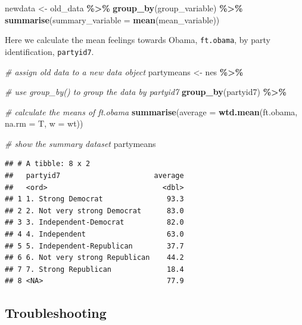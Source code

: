\documentclass[
]{book}
\newenvironment{Shaded}{\begin{snugshade}}{\end{snugshade}}
\newcommand{\AttributeTok}[1]{\textcolor[rgb]{0.13,0.29,0.53}{#1}}
\newcommand{\CommentTok}[1]{\textcolor[rgb]{0.56,0.35,0.01}{\textit{#1}}}
\newcommand{\FunctionTok}[1]{\textcolor[rgb]{0.13,0.29,0.53}{\textbf{#1}}}
\newcommand{\NormalTok}[1]{#1}
\newcommand{\OtherTok}[1]{\textcolor[rgb]{0.56,0.35,0.01}{#1}}
\newcommand{\SpecialCharTok}[1]{\textcolor[rgb]{0.81,0.36,0.00}{\textbf{#1}}}
\begin{document}
\begin{Shaded}
\begin{Highlighting}[]
\NormalTok{newdata }\OtherTok{\textless{}{-}}\NormalTok{ old\_data }\SpecialCharTok{\%\textgreater{}\%}
  \FunctionTok{group\_by}\NormalTok{(group\_variable) }\SpecialCharTok{\%\textgreater{}\%}
  \FunctionTok{summarise}\NormalTok{(}\AttributeTok{summary\_variable =} \FunctionTok{mean}\NormalTok{(mean\_variable))}
\end{Highlighting}
\end{Shaded}

Here we calculate the mean feelings towards Obama, \texttt{ft.obama}, by party identification, \texttt{partyid7}.

\begin{Shaded}
\begin{Highlighting}[]
\CommentTok{\# assign old data to a new data object}
\NormalTok{partymeans }\OtherTok{\textless{}{-}}\NormalTok{ nes }\SpecialCharTok{\%\textgreater{}\%}
  
  \CommentTok{\# use group\_by() to group the data by partyid7}
  \FunctionTok{group\_by}\NormalTok{(partyid7) }\SpecialCharTok{\%\textgreater{}\%}
  
  \CommentTok{\# calculate the means of ft.obama}
  \FunctionTok{summarise}\NormalTok{(}\AttributeTok{average =} \FunctionTok{wtd.mean}\NormalTok{(ft.obama, }\AttributeTok{na.rm =}\NormalTok{ T,}
                               \AttributeTok{w =}\NormalTok{ wt))}

\CommentTok{\# show the summary dataset}
\NormalTok{partymeans}
\end{Highlighting}
\end{Shaded}

\begin{verbatim}
## # A tibble: 8 x 2
##   partyid7                      average
##   <ord>                           <dbl>
## 1 1. Strong Democrat               93.3
## 2 2. Not very strong Democrat      83.0
## 3 3. Independent-Democrat          82.0
## 4 4. Independent                   63.0
## 5 5. Independent-Republican        37.7
## 6 6. Not very strong Republican    44.2
## 7 7. Strong Republican             18.4
## 8 <NA>                             77.9
\end{verbatim}

\hypertarget{troubleshooting-19}{%
\subsection{Troubleshooting}\label{troubleshooting-19}}
\end{document}
